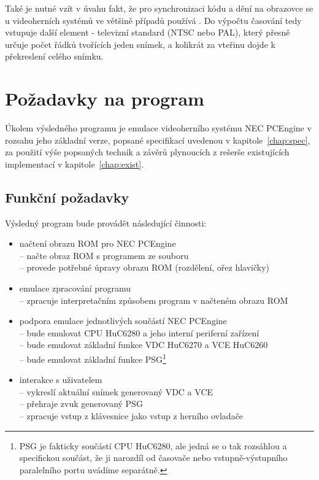 Také je nutné vzít v úvahu fakt, že pro synchronizaci kódu a dění na obrazovce
se u videoherních systémů ve většině případů používá . Do výpočtu časování tedy vstupuje další element - televizní
standard (NTSC nebo PAL), který přesně určuje počet řádků tvořících jeden
snímek, a kolikrát za vteřinu dojde k překreslení celého snímku.


\section{Požadavky na program}\label{chap:anal_requirements}

Úkolem výsledného programu je emulace videoherního systému NEC PCEngine v
rozsahu jeho základní verze, popsané specifikací uvedenou v
kapitole~\ref{chap:spec}, za použití výše popsaných technik a závěrů plynoucích
z rešerše existujících implementací v kapitole~\ref{chap:exist}.

%
%

\subsection{Funkční požadavky}

Výsledný program bude provádět následující činnosti:
\begin{itemize}
	\item načtení obrazu ROM pro NEC PCEngine \\
		\--- načte obraz ROM s programem ze souboru \\
		\--- provede potřebné úpravy obrazu ROM (rozdělení, ořez hlavičky)

	\item emulace zpracování programu \\
		\--- zpracuje interpretačním způsobem program v načteném obrazu ROM

	\item podpora emulace jednotlivých součástí NEC PCEngine \\
		\--- bude emulovat CPU HuC6280 a jeho interní periferní zařízení \\
		\--- bude emulovat základní funkce VDC HuC6270 a VCE HuC6260 \\
		\--- bude emulovat základní funkce PSG\footnote{PSG je fakticky
		součástí CPU HuC6280, ale jedná se o tak rozsáhlou a specifickou
		součást, že ji narozdíl od časovače nebo vstupně-výstupního paralelního
		portu uvádíme separátně.}

	\item interakce s uživatelem \\
		\--- vykreslí aktuální snímek generovaný VDC a VCE \\
		\--- přehraje zvuk generovaný PSG \\
		\--- zpracuje vstup z klávesnice jako vstup z herního ovladače
\end{itemize}

